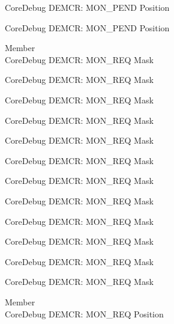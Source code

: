 \begin{DoxyRefList}
\label{deprecated__deprecated001161}%
%
Core\+Debug DEMCR\+: MON\+\_\+\+PEND Position 

\label{deprecated__deprecated001263}%
%
Core\+Debug DEMCR\+: MON\+\_\+\+PEND Position  
\item[Member \doxylink{group___c_m_s_i_s___core_debug_gae6384cbe8045051186d13ef9cdeace95}{Core\+Debug\+\_\+\+DEMCR\+\_\+\+MON\+\_\+\+REQ\+\_\+\+Msk} ]\hfill \\
\label{deprecated__deprecated000048}%
%
Core\+Debug DEMCR\+: MON\+\_\+\+REQ Mask 

\label{deprecated__deprecated000192}%
%
Core\+Debug DEMCR\+: MON\+\_\+\+REQ Mask 

\label{deprecated__deprecated000334}%
%
Core\+Debug DEMCR\+: MON\+\_\+\+REQ Mask 

\label{deprecated__deprecated000410}%
%
Core\+Debug DEMCR\+: MON\+\_\+\+REQ Mask 

\label{deprecated__deprecated000499}%
%
Core\+Debug DEMCR\+: MON\+\_\+\+REQ Mask 

\label{deprecated__deprecated000601}%
%
Core\+Debug DEMCR\+: MON\+\_\+\+REQ Mask 

\label{deprecated__deprecated000707}%
%
Core\+Debug DEMCR\+: MON\+\_\+\+REQ Mask 

\label{deprecated__deprecated000851}%
%
Core\+Debug DEMCR\+: MON\+\_\+\+REQ Mask 

\label{deprecated__deprecated000993}%
%
Core\+Debug DEMCR\+: MON\+\_\+\+REQ Mask 

\label{deprecated__deprecated001069}%
%
Core\+Debug DEMCR\+: MON\+\_\+\+REQ Mask 

\label{deprecated__deprecated001158}%
%
Core\+Debug DEMCR\+: MON\+\_\+\+REQ Mask 

\label{deprecated__deprecated001260}%
%
Core\+Debug DEMCR\+: MON\+\_\+\+REQ Mask  
\item[Member \doxylink{group___c_m_s_i_s___core_debug_ga341020a3b7450416d72544eaf8e57a64}{Core\+Debug\+\_\+\+DEMCR\+\_\+\+MON\+\_\+\+REQ\+\_\+\+Pos} ]\hfill \\
\label{deprecated__deprecated000047}%
%
Core\+Debug DEMCR\+: MON\+\_\+\+REQ Position 


\end{DoxyRefList}
